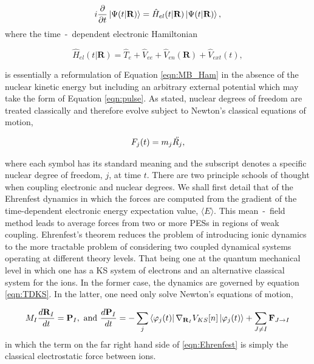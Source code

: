 \begin{equation}
    i \frac{\partial}{\partial t} \ket{\Psi(t|\textbf{R})} = \hat{H}_{el}(t|\textbf{R})\ket{\Psi(t|\textbf{R})},
    \label{eqn:nanm_TDSE}
\end{equation}
where the time~-~dependent electronic Hamiltonian 

\begin{equation}
    \hat{H}_{el}(t|\textbf{R}) = \hat{T}_{e} + \hat{V}_{ee} + \hat{V}_{en}(\textbf{R}) + \hat{V}_{ext}(t),
    \label{eqn:nanm_ham}
\end{equation}

is essentially a reformulation of Equation \ref{eqn:MB_Ham} in the absence of the nuclear kinetic energy but including an arbitrary external potential which may take the form of Equation \ref{eqn:pulse}. As stated, nuclear degrees of freedom are treated classically and therefore evolve subject to Newton's classical equations of motion,

\begin{equation}
    F_{j}(t) = m_{j}\Ddot{R_{j}},
    \label{eqng:nanm_force}
\end{equation}

where each symbol has its standard meaning and the subscript denotes a specific nuclear degree of freedom, $j$, at time $t$. There are two principle schools of thought when coupling electronic and nuclear degrees. We shall first detail that of the Ehrenfest dynamics \cite{10.1063/1.438598} in which  the forces are computed from the gradient of the time-dependent electronic energy expectation value, $\langle E \rangle$. This mean~-~field method leads to average forces from two or more PESs in regions of weak coupling. Ehrenfest's theorem reduces the problem of introducing ionic dynamics to the more tractable problem of considering two coupled dynamical systems operating at different theory levels. That being one at the quantum mechanical level in which one has a KS system of electrons and an alternative classical system for the ions. In the former case, the dynamics are governed by equation \ref{eqn:TDKS}. In the latter, one need only solve Newton's equations of motion,

\begin{equation}
    M_{I}\frac{d\textbf{R}_{I}}{dt} = \textbf{P}_{I}, \text{ and } \frac{d\textbf{P}_{I}}{dt} = -\sum_{j} \bra{\varphi_{j}(t)}\nabla_{\textbf{R}_{I}}V_{KS}[n]\ket{ \varphi_{j}(t) } + \sum_{J \neq I} \textbf{F}_{J \rightarrow I}
    \label{eqn:Ehrenfest}
\end{equation}
in which the term on the far right hand side of \ref{eqn:Ehrenfest} is simply the classical electrostatic force between ions.

